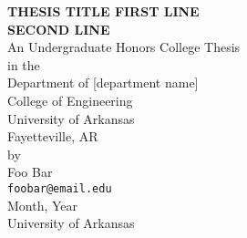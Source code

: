 \begin{titlepage}
  \vspace{1 in}
  \begin{center}
    \large
    
    \textbf{THESIS TITLE FIRST LINE \\ SECOND LINE} \\
    \vspace{1.5 in}
    An Undergraduate Honors College Thesis \\
    in the \\
    Department of [department name] \\
    College of Engineering \\
    University of Arkansas \\
    Fayetteville, AR \\
    \vspace{1 in}
    by \\
    \vspace{0.8 in}
    Foo Bar \\
    \texttt{foobar@email.edu} \\
    \vspace{1.5 in}
    Month, Year \\
    University of Arkansas \\

  \end{center}
\end{titlepage}
